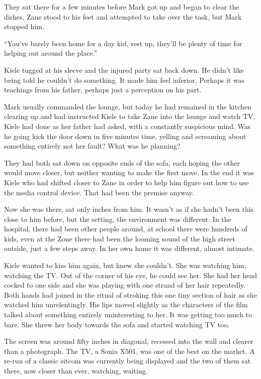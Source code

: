 They sat there for a few minutes before Mark got up and began to clear the dishes.  Zane stood to his feet and attempted to take over the task, but Mark stopped him.

``You've barely been home for a day kid, rest up, they'll be plenty of time for helping out around the place.''

Kiele tugged at his sleeve and the injured party sat back down.  He didn't like being told he couldn't do something.  It made him feel inferior.  Perhaps it was teachings from his father, perhaps just a perception on his part.



\thoughtbreak



Mark usually commanded the lounge, but today he had remained in the kitchen clearing up and had instructed Kiele to take Zane into the lounge and watch TV.  Kiele had done as her father had asked, with a constantly suspicious mind.  Was he going kick the door down in five minutes time, yelling and screaming about something entirely not her fault?  What was he planning?

They had both sat down on opposite ends of the sofa, each hoping the other would move closer, but neither wanting to make the first move.  In the end it was Kiele who had shifted closer to Zane in order to help him figure out how to use the media control device.  That had been the premise anyway.

Now she was there, sat only inches from him.  It wasn't as if she hadn't been this close to him before, but the setting, the environment was different.  In the hospital, there had been other people around, at school there were hundreds of kids, even at the Zone there had been the looming sound of the high street outside, just a few steps away.  In her own home it was different, almost intimate.

Kiele wanted to kiss him again, but knew she couldn't.  She was watching him, watching the TV.  Out of the corner of his eye, he could see her.  She had her head cocked to one side and she was playing with one strand of her hair repeatedly.  Both hands had joined in the ritual of stroking this one tiny section of hair as she watched him unrelentingly.  His lips moved slightly as the characters of the film talked about something entirely uninteresting to her.  It was getting too much to bare.  She threw her body towards the sofa and started watching TV too.

The screen was around fifty inches in diagonal, recessed into the wall and clearer than a photograph.  The TV, a Sonia X501, was one of the best on the market.  A re-run of a classic sitcom was currently being displayed and the two of them sat there, now closer than ever, watching, waiting.  

